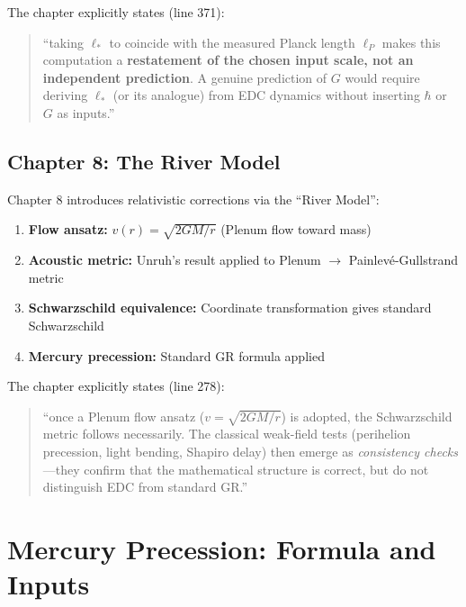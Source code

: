 \documentclass[11pt,a4paper]{article}
\begin{document}
\begin{tcolorbox}[colback=red!5,colframe=red!50!black,title=Critical Caveat from Chapter 7]
The chapter explicitly states (line 371):
\begin{quote}
``taking $\ell_*$ to coincide with the measured Planck length $\ell_P$ makes this computation a \textbf{restatement of the chosen input scale, not an independent prediction}. A genuine prediction of $G$ would require deriving $\ell_*$ (or its analogue) from EDC dynamics without inserting $\hbar$ or $G$ as inputs.''
\end{quote}
\end{tcolorbox}

\subsection{Chapter 8: The River Model}

Chapter 8 introduces relativistic corrections via the ``River Model'':

\begin{enumerate}
    \item \textbf{Flow ansatz:} $v(r) = \sqrt{2GM/r}$ (Plenum flow toward mass)
    \item \textbf{Acoustic metric:} Unruh's result applied to Plenum $\to$ Painlev\'e-Gullstrand metric
    \item \textbf{Schwarzschild equivalence:} Coordinate transformation gives standard Schwarzschild
    \item \textbf{Mercury precession:} Standard GR formula applied
\end{enumerate}

\begin{tcolorbox}[colback=yellow!5,colframe=yellow!50!black,title=Critical Caveat from Chapter 8]
The chapter explicitly states (line 278):
\begin{quote}
``once a Plenum flow ansatz ($v = \sqrt{2GM/r}$) is adopted, the Schwarzschild metric follows necessarily. The classical weak-field tests (perihelion precession, light bending, Shapiro delay) then emerge as \textit{consistency checks}---they confirm that the mathematical structure is correct, but do not distinguish EDC from standard GR.''
\end{quote}
\end{tcolorbox}

\section{Mercury Precession: Formula and Inputs}
\label{sec:mercury}
\end{document}
